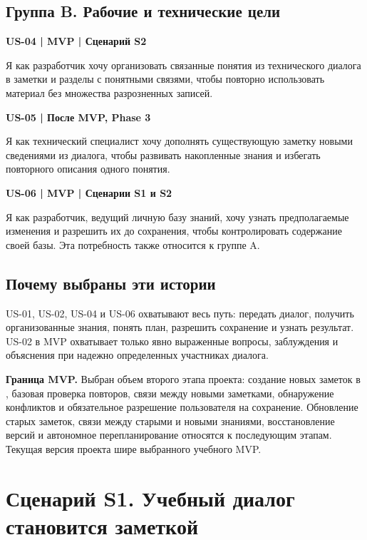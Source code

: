 \subsection{Группа B. Рабочие и технические цели}

\textbf{US-04 | MVP | Сценарий S2}

\nopagebreak[4]

Я как разработчик хочу организовать связанные понятия из технического диалога в заметки и разделы с понятными связями, чтобы повторно использовать материал без множества разрозненных записей.


\textbf{US-05 | После MVP, Phase 3}

\nopagebreak[4]

Я как технический специалист хочу дополнять существующую заметку новыми сведениями из диалога, чтобы развивать накопленные знания и избегать повторного описания одного понятия.


\textbf{US-06 | MVP | Сценарии S1 и S2}

\nopagebreak[4]

Я как разработчик, ведущий личную базу знаний, хочу узнать предполагаемые изменения и разрешить их до сохранения, чтобы контролировать содержание своей базы. Эта потребность также относится к группе A.


\subsection{Почему выбраны эти истории}

US-01, US-02, US-04 и US-06 охватывают весь путь: передать диалог, получить организованные знания, понять план, разрешить сохранение и узнать результат. US-02 в MVP охватывает только явно выраженные вопросы, заблуждения и объяснения при надежно определенных участниках диалога.


\textbf{Граница MVP.} Выбран объем второго этапа проекта: создание новых заметок в , базовая проверка повторов, связи между новыми заметками, обнаружение конфликтов и обязательное разрешение пользователя на сохранение. Обновление старых заметок, связи между старыми и новыми знаниями, восстановление версий и автономное перепланирование относятся к последующим этапам. Текущая версия проекта шире выбранного учебного MVP.



\clearpage
\section{Сценарий S1. Учебный диалог становится заметкой}

